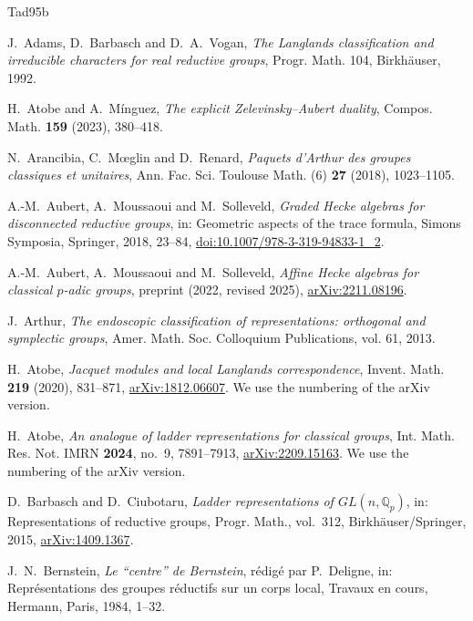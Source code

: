 \documentclass[a4paper,12pt,leqno]{amsart}
\theoremstyle{plain}
\theoremstyle{definition}
\begin{document}
\begin{thebibliography}{Tad95b}

 J.~Adams, D.~Barbasch and D.~A.~Vogan, \emph{The Langlands classification and
irreducible characters for real reductive groups}, Progr. Math. 104, Birkh\"auser, 1992.

 H.~Atobe and A.~M\'inguez, \emph{The explicit Zelevinsky--Aubert duality},
Compos. Math. \textbf{159} (2023), 380--418.

 N.~Arancibia, C.~M\oe glin and D.~Renard, \emph{Paquets d'Arthur des groupes
classiques et unitaires}, Ann. Fac. Sci. Toulouse Math. (6) \textbf{27} (2018), 1023--1105.

 A.-M.~Aubert, A.~Moussaoui and M.~Solleveld, \emph{Graded Hecke algebras for
disconnected reductive groups}, in: Geometric aspects of the trace formula, Simons Symposia, Springer,
2018, 23--84, \href{https://doi.org/10.1007/978-3-319-94833-1_2}{doi:10.1007/978-3-319-94833-1\_2}.

 A.-M.~Aubert, A.~Moussaoui and M.~Solleveld, \emph{Affine Hecke algebras for
classical $p$-adic groups}, preprint (2022, revised 2025),
\href{https://arxiv.org/abs/2211.08196}{arXiv:2211.08196}.

 J.~Arthur, \emph{The endoscopic classification of representations: orthogonal
and symplectic groups}, Amer. Math. Soc. Colloquium Publications, vol. 61, 2013.

 H.~Atobe, \emph{Jacquet modules and local Langlands correspondence}, Invent.
Math. \textbf{219} (2020), 831--871, \href{https://arxiv.org/abs/1812.06607}{arXiv:1812.06607}. We use the numbering of the arXiv version.

 H.~Atobe, \emph{An analogue of ladder representations for classical groups},
Int. Math. Res. Not. IMRN \textbf{2024}, no.~9, 7891--7913, \href{https://arxiv.org/abs/2209.15163}{arXiv:2209.15163}. We use the numbering of the arXiv version.

 D.~Barbasch and D.~Ciubotaru, \emph{Ladder representations of
$GL(n,\mathbb{Q}_p)$}, in: Representations of reductive groups, Progr. Math., vol.~312,
Birkh\"auser/Springer, 2015, \href{https://arxiv.org/abs/1409.1367}{arXiv:1409.1367}.

 J.~N.~Bernstein, \emph{Le ``centre'' de Bernstein}, r\'edig\'e par P.~Deligne, in:
Repr\'esentations des groupes r\'eductifs sur un corps local, Travaux en cours, Hermann, Paris, 1984,
1--32.


\end{thebibliography}
\end{document}
